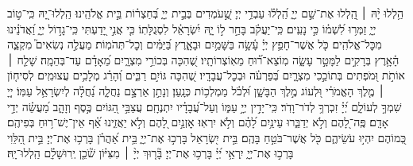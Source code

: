 \documentclass[twoside, openany, parskip=half, 11pt]{book}
\begin{document}
\begin{narrow}
הַ֥לְלוּ יָ֨הּ ׀ \hfill
הַֽ֭לְלוּ אֶת־שֵׁ֣ם יְיָ֑ הַֽ֝לְל֗וּ עַבְדֵ֥י יְיָ׃
שֶׁ֣֭עֹמְדִים בְּבֵ֣ית יְיָ֑ בְּ֝חַצְר֗וֹת בֵּ֣ית אֱלֹהֵֽינוּ׃
הַֽלְלוּ־יָ֭הּ כִּֽי־ט֣וֹב יְיָ֑ זַמְּר֥וּ לִ֝שְׁמ֗וֹ כִּ֣י נָעִֽים׃
כִּֽי־יַעֲקֹ֗ב בָּחַ֣ר ל֣וֹ יָ֑הּ יִ֝שְׂרָאֵ֗ל לִסְגֻלָּתֽוֹ׃
כִּ֤י אֲנִ֣י יָ֭דַעְתִּי כִּֽי־גָד֣וֹל יְיָ֑ וַ֝אֲדֹנֵ֗ינוּ מִכׇּל־אֱלֹהִֽים׃
כֹּ֤ל אֲשֶׁר־חָפֵ֥ץ יְיָ֗ עָ֫שָׂ֥ה בַּשָּׁמַ֥יִם וּבָאָ֑רֶץ בַּ֝יַּמִּ֗ים וְכׇל־תְּהֹמֽוֹת׃
מַעֲלֶ֣ה נְשִׂאִים֮ מִקְצֵ֢ה הָ֫אָ֥רֶץ בְּרָקִ֣ים לַמָּטָ֣ר עָשָׂ֑ה מֽוֹצֵא־ר֗֝וּחַ מֵאֽוֹצְרוֹתָֽיו׃
שֶׁ֭הִכָּה בְּכוֹרֵ֣י מִצְרָ֑יִם מֵ֝אָדָ֗ם עַד־בְּהֵמָֽה׃
שָׁלַ֤ח ׀ אוֹתֹ֣ת וּ֭מֹפְתִים בְּתוֹכֵ֣כִי מִצְרָ֑יִם בְּ֝פַרְעֹ֗ה וּבְכׇל־עֲבָדָֽיו׃
שֶׁ֭הִכָּה גּוֹיִ֣ם רַבִּ֑ים וְ֝הָרַ֗ג מְלָכִ֥ים עֲצוּמִֽים׃
לְסִיח֤וֹן ׀ מֶ֤לֶךְ הָאֱמֹרִ֗י וּ֭לְעוֹג מֶ֣לֶךְ הַבָּשָׁ֑ן וּ֝לְכֹ֗ל מַמְלְכ֥וֹת כְּנָֽעַן׃
וְנָתַ֣ן אַרְצָ֣ם נַחֲלָ֑ה נַ֝חֲלָ֗ה לְיִשְׂרָאֵ֥ל עַמּֽוֹ׃
יְיָ֭ שִׁמְךָ֣ לְעוֹלָ֑ם יְ֝יָ֗ זִכְרְךָ֥ לְדֹר־וָדֹֽר׃
כִּֽי־יָדִ֣ין יְיָ֣ עַמּ֑וֹ וְעַל־עֲ֝בָדָ֗יו יִתְנֶחָֽם׃
עֲצַבֵּ֣י הַ֭גּוֹיִם כֶּ֣סֶף וְזָהָ֑ב מַ֝עֲשֵׂ֗ה יְדֵ֣י אָדָֽם׃
פֶּֽה־לָ֭הֶם וְלֹ֣א יְדַבֵּ֑רוּ עֵינַ֥יִם לָ֝הֶ֗ם וְלֹ֣א יִרְאֽוּ׃
אׇזְנַ֣יִם לָ֭הֶם וְלֹ֣א יַאֲזִ֑ינוּ אַ֗֝ף אֵין־יֶשׁ־ר֥וּחַ בְּפִיהֶֽם׃
כְּ֭מוֹהֶם יִהְי֣וּ עֹשֵׂיהֶ֑ם כֹּ֖ל אֲשֶׁר־בֹּטֵ֣חַ בָּהֶֽם׃
בֵּ֣ית יִ֭שְׂרָאֵל בָּרְכ֣וּ אֶת־יְיָ֑ בֵּ֥ית אַ֝הֲרֹ֗ן בָּרְכ֥וּ אֶת־יְיָ׃
בֵּ֣ית הַ֭לֵּוִי בָּרְכ֣וּ אֶת־יְיָ֑ יִֽרְאֵ֥י יְ֝יָ֗ בָּרְכ֥וּ אֶת־יְיָ׃
בָּ֘ר֤וּךְ יְיָ֨ ׀ מִצִּיּ֗וֹן שֹׁ֘כֵ֤ן יְֽרוּשָׁלָ֗‍ִם הַֽלְלוּ־יָֽהּ׃




\end{narrow}
\end{document}
